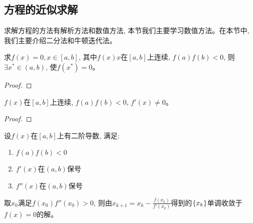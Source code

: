 \subsection{方程的近似求解}
求解方程的方法有解析方法和数值方法, 本节我们主要学习数值方法。在本节中, 我们主要介绍二分法和牛顿迭代法。
\begin{proposition}[二分法]
    求$f(x) = 0, x \in [a, b]$, 其中$f(x)x$在$[a, b]$上连续, $f(a)f(b) < 0$, 则$\exists x^* \in (a, b)$, 使$f(x^*) = 0$。
\end{proposition}
\begin{proof}
    
\end{proof}

\begin{proposition}
    $f(x)$在$[a, b]$上连续, $f(a)f(b) < 0$, $f'(x) \neq 0$。
\end{proposition}
\begin{proof}
    
\end{proof}

\begin{example}
    设$f(x)$在$[a, b]$上有二阶导数, 满足:
    \begin{enumerate}
        \item $f(a)f(b) < 0$
        \item $f'(x)$在$(a, b)$保号
        \item $f''(x)$在$(a, b)$保号
    \end{enumerate}
    取$x_0$满足$f(x_0)f''(x_0) > 0$, 则由$x_{k+1} = x_k - \frac{f(x_k)}{f'(x_k)}$得到的$\left\{ x_k\right\}$单调收敛于$f(x) = 0$的解。
\end{example}




